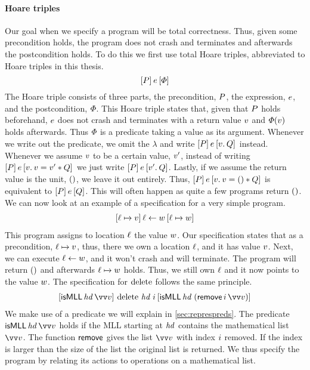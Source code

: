 \documentclass[thesis.tex]{subfiles}
\begin{document}
\paragraph{Hoare triples}
Our goal when we specify a program will be total correctness. Thus, given some precondition holds, the program does not crash and terminates and afterwards the postcondition holds. To do this we first use total Hoare triples, abbreviated to Hoare triples in this thesis.
\[\hoare{\prop}{\expr}{\pred}\]
The Hoare triple consists of three parts, the precondition, $P$, the expression, $e$, and the postcondition, $\varPhi$. This Hoare triple states that, given that $P$ holds beforehand, $e$ does not crash and terminates with a return value $v$ and $\varPhi(v)$ holds afterwards. Thus $\varPhi$ is a predicate taking a value as its argument. Whenever we write out the predicate, we omit the $\lambda$ and write $\hoare{\prop}{\expr}{\Ret\val. \propB}$ instead. Whenever we assume $v$ to be a certain value, $v'$, instead of writing $\hoare{\prop}\expr{\Ret\val. \val = \val' * \propB}$ we just write $\hoare{\prop}\expr{\Ret\val'. \propB}$. Lastly, if we assume the return value is the unit, $()$, we leave it out entirely. Thus, $\hoare{\prop}\expr{\Ret\val. \val = \TT * \propB}$ is equivalent to $\hoare{\prop}\expr{\propB}$. This will often happen as quite a few programs return $()$. We can now look at an example of a specification for a very simple program.
\begin{align*}
  \hoare{\loc\fmapsto\val}{\loc\gets\valB}{\loc\fmapsto\valB}
\end{align*}
This program assigns to location $\ell$ the value $w$. Our specification states that as a precondition, $\loc\fmapsto\val$, thus, there we own a location $\ell$, and it has value $v$. Next, we can execute $\ell\leftarrow w$, and it won't crash and will terminate. The program will return $()$ and afterwards $\loc\fmapsto\valB$ holds. Thus, we still own $\ell$ and it now points to the value $w$. The specification for $\operatorname{delete}$ follows the same principle.
\begin{align*}
  \hoare{\isMLL\, \langv{hd}\, \vect{\val}}{\MLLdelete\, \langv{hd}\; \iindex }{\isMLL\, \langv{hd}\; (\textlog{remove}\, \iindex\, \vect{\val})}
\end{align*}
We make use of a predicate we will explain in \cref*{sec:represpreds}. The predicate $\isMLL\, \langv{hd}\, \vect{\val}$ holds if the MLL starting at $\mathit{hd}$ contains the mathematical list $\vect{\val}$. The function $\textsf{\upshape remove}$ gives the list $\vect{\val}$ with index $i$ removed. If the index is larger than the size of the list the original list is returned. We thus specify the program by relating its actions to operations on a mathematical list.
\end{document}
